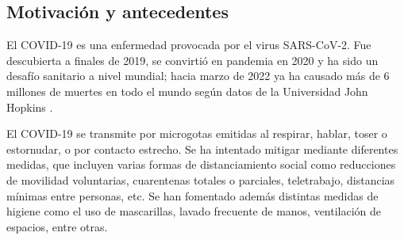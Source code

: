 \begin{intro}





\section*{Motivación y antecedentes}

El COVID-19 es una enfermedad provocada por el virus SARS-CoV-2. Fue descubierta a finales de 2019, se convirtió en pandemia en 2020 y ha sido un desafío sanitario a nivel mundial; hacia marzo de 2022 ya ha causado más de 6 millones de muertes en todo el mundo según datos de la Universidad John Hopkins \cite{Dong2020}. %

El COVID-19 se transmite por microgotas emitidas al respirar, hablar, toser o estornudar, o por contacto estrecho. Se ha intentado mitigar mediante diferentes medidas, que incluyen varias formas de distanciamiento social como reducciones de movilidad voluntarias, cuarentenas totales o parciales, teletrabajo, distancias mínimas entre personas, etc. Se han fomentado además distintas medidas de higiene como el uso de mascarillas, lavado frecuente de manos, ventilación de espacios, entre otras.


\end{intro}
